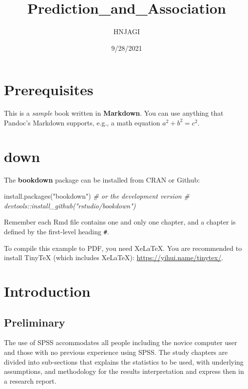 \documentclass[
]{book}
\title{Prediction\_and\_Association}
\author{HNJAGI}
\date{9/28/2021}
\newenvironment{Shaded}{\begin{snugshade}}{\end{snugshade}}
\newcommand{\CommentTok}[1]{\textcolor[rgb]{0.56,0.35,0.01}{\textit{#1}}}
\newcommand{\FunctionTok}[1]{\textcolor[rgb]{0.00,0.00,0.00}{#1}}
\newcommand{\NormalTok}[1]{#1}
\newcommand{\StringTok}[1]{\textcolor[rgb]{0.31,0.60,0.02}{#1}}
\begin{document}
\maketitle

{
\setcounter{tocdepth}{1}
\tableofcontents
}
\hypertarget{prerequisites}{%
\chapter{Prerequisites}\label{prerequisites}}

This is a \emph{sample} book written in \textbf{Markdown}. You can use anything that Pandoc's Markdown supports, e.g., a math equation \(a^2 + b^2 = c^2\).

\hypertarget{down}{%
\chapter{down}\label{down}}

The \textbf{bookdown} package can be installed from CRAN or Github:

\begin{Shaded}
\begin{Highlighting}[]
\FunctionTok{install.packages}\NormalTok{(}\StringTok{"bookdown"}\NormalTok{)}
\CommentTok{\# or the development version}
\CommentTok{\# devtools::install\_github("rstudio/bookdown")}
\end{Highlighting}
\end{Shaded}

Remember each Rmd file contains one and only one chapter, and a chapter is defined by the first-level heading \texttt{\#}.

To compile this example to PDF, you need XeLaTeX. You are recommended to install TinyTeX (which includes XeLaTeX): \url{https://yihui.name/tinytex/}.

\hypertarget{intro}{%
\chapter{Introduction}\label{intro}}

\hypertarget{preliminary}{%
\section{Preliminary}\label{preliminary}}

The use of SPSS accommodates all people including the novice computer user and those with no previous experience using SPSS. The study chapters are divided into sub-sections that explains the statistics to be used, with underlying assumptions, and methodology for the results interpretation and express then in a research report.
\end{document}
